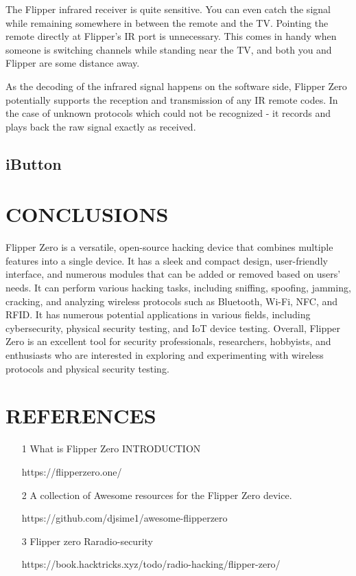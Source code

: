 \documentclass[a4paper,11pt]{report}
\begin{document}
The Flipper infrared receiver is quite sensitive. You can even catch the signal while remaining somewhere in between the remote and the TV. Pointing the remote directly at Flipper's IR port is unnecessary. This comes in handy when someone is switching channels while standing near the TV, and both you and Flipper are some distance away.

As the decoding of the infrared signal happens on the software side, Flipper Zero potentially supports the reception and transmission of any IR remote codes. In the case of unknown protocols which could not be recognized - it records and plays back the raw signal exactly as received.
\section{iButton}
\chapter{CONCLUSIONS}
Flipper Zero is a versatile, open-source hacking device that combines multiple features into a single device. It has a sleek and compact design, user-friendly interface, and numerous modules that can be added or removed based on users' needs. It can perform various hacking tasks, including sniffing, spoofing, jamming, cracking, and analyzing wireless protocols such as Bluetooth, Wi-Fi, NFC, and RFID. It has numerous potential applications in various fields, including cybersecurity, physical security testing, and IoT device testing. Overall, Flipper Zero is an excellent tool for security professionals, researchers, hobbyists, and enthusiasts who are interested in exploring and experimenting with wireless protocols and physical security testing.
\chapter{REFERENCES}
\begin{itemize}
\item [1] What is Flipper Zero INTRODUCTION  
                                                                     
https://flipperzero.one/
\item[2] A collection of Awesome resources for the Flipper Zero device.

https://github.com/djsime1/awesome-flipperzero
\item[3] Flipper zero Raradio-security

https://book.hacktricks.xyz/todo/radio-hacking/flipper-zero/
\vspace{12pt}
\end{itemize}
\end{document}
